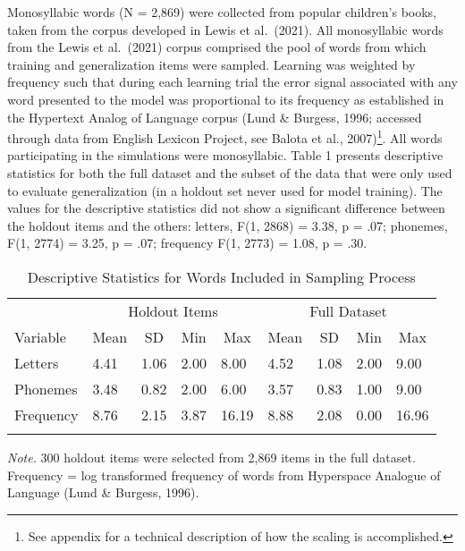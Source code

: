 \documentclass[
  ,man,floatsintext]{apa6}
\begin{document}
Monosyllabic words (N = 2,869) were collected from popular children's books, taken from the corpus developed in Lewis et al.~(2021). All monosyllabic words from the Lewis et al.~(2021) corpus comprised the pool of words from which training and generalization items were sampled. Learning was weighted by frequency such that during each learning trial the error signal associated with any word presented to the model was proportional to its frequency as established in the Hypertext Analog of Language corpus (Lund \& Burgess, 1996; accessed through data from English Lexicon Project, see Balota et al., 2007)\footnote{See appendix for a technical description of how the scaling is accomplished.}. All words participating in the simulations were monosyllabic. Table 1 presents descriptive statistics for both the full dataset and the subset of the data that were only used to evaluate generalization (in a holdout set never used for model training). The values for the descriptive statistics did not show a significant difference between the holdout items and the others: letters, F(1, 2868) = 3.38, p = .07; phonemes, F(1, 2774) = 3.25, p = .07; frequency F(1, 2773) = 1.08, p = .30.

\begin{table}[tbp]

\begin{center}
\begin{threeparttable}

\caption{\label{tab:table1}Descriptive Statistics for Words Included in Sampling Process}

\begin{tabular}{lllllllll}
\toprule
 & \multicolumn{4}{c}{Holdout Items} & \multicolumn{4}{c}{Full Dataset} \\
\cmidrule(r){2-5} \cmidrule(r){6-9}
Variable & \multicolumn{1}{c}{Mean} & \multicolumn{1}{c}{SD} & \multicolumn{1}{c}{Min} & \multicolumn{1}{c}{Max} & \multicolumn{1}{c}{Mean} & \multicolumn{1}{c}{SD} & \multicolumn{1}{c}{Min} & \multicolumn{1}{c}{Max}\\
\midrule
Letters & 4.41 & 1.06 & 2.00 & 8.00 & 4.52 & 1.08 & 2.00 & 9.00\\
Phonemes & 3.48 & 0.82 & 2.00 & 6.00 & 3.57 & 0.83 & 1.00 & 9.00\\
Frequency & 8.76 & 2.15 & 3.87 & 16.19 & 8.88 & 2.08 & 0.00 & 16.96\\
\bottomrule
\addlinespace
\end{tabular}

\begin{tablenotes}[para]
\normalsize{\textit{Note.} 300 holdout items were selected from 2,869 items in the full dataset. Frequency = log transformed frequency of words from Hyperspace Analogue of Language (Lund \& Burgess, 1996).}
\end{tablenotes}

\end{threeparttable}
\end{center}

\end{table}
\end{document}
